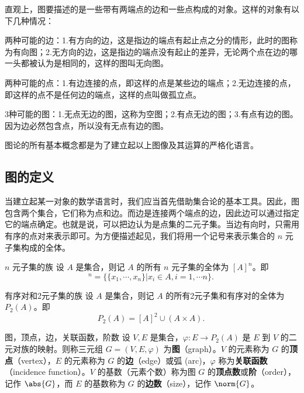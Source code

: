 
\begin{issues}
\issueTODO
\end{issues}


\cite{graph1}\cite{graph2}直观上，图要描述的是一些带有两端点的边和一些点构成的对象。这样的对象有以下几种情况：

两种可能的边：1.有方向的边，这是指边的端点有起止点之分的情形，此时的图称为有向图；2.无方向的边，这是指边的端点没有起止的差异，无论两个点在边的哪一头都被认为是相同的，这样的图叫无向图。

两种可能的点：1.有边连接的点，即这样的点是某些边的端点；2.无边连接的点，即这样的点不是任何边的端点，这样的点叫做孤立点。

3种可能的图：1.无点无边的图，这称为空图；2.有点无边的图；3.有点有边的图。因为边必然包含点，所以没有无点有边的图。

图论的所有基本概念都是为了建立起以上图像及其运算的严格化语言。


\subsection{图的定义}

当建立起某一对象的数学语言时，我们应当首先借助集合论的基本工具。因此，图包含两个集合，它们称为点和边。而边是连接两个端点的边，因此边可以通过指定它的端点确定。也就是说，可以把边认为是点集的二元子集。当边有向时，只需用有序的点对来表示即可。为方便描述起见，我们将用一个记号来表示集合的 $n$ 元子集构成的全体。

\begin{definition}{$n$ 元子集的族}
设 $A$ 是集合，则记 $A$ 的所有 $n$ 元子集的全体为 $[A]^n$。即
\begin{equation}
[A]^n=\{\{x_1,\cdots,x_n\}|x_i\in A,i=1,\cdots n\}.~
\end{equation}
\end{definition}

\begin{definition}{有序对和2元子集的族}
设 $A$ 是集合，则记 $A$ 的所有2元子集和有序对的全体为 $P_2(A)$。即
\begin{equation}
P_2(A)=[A]^2\cup (A\times A).~
\end{equation}

\end{definition}




\begin{definition}{图，顶点，边，关联函数，阶数}
设 $V,E$ 是集合，$\varphi:E\rightarrow P_2(A)$ 是 $E$ 到 $V$ 的二元对族的映射。则称三元组 $G=(V,E,\varphi)$ 为\textbf{图}（graph）。$V$ 的元素称为 $G$ 的\textbf{顶点}（vertex），$E$ 的元素称为 $G$ 的\textbf{边}（edge）或弧 (arc)，$\varphi$ 称为\textbf{关联函数}（incidence function）。$V$ 的基数（元素个数）称为图 $G$ 的\textbf{顶点数}或\textbf{阶}（order），记作 $\abs{G}$，而 $E$ 的基数称为 $G$ 的\textbf{边数}（size），记作 $\norm{G}$。
\end{definition}


